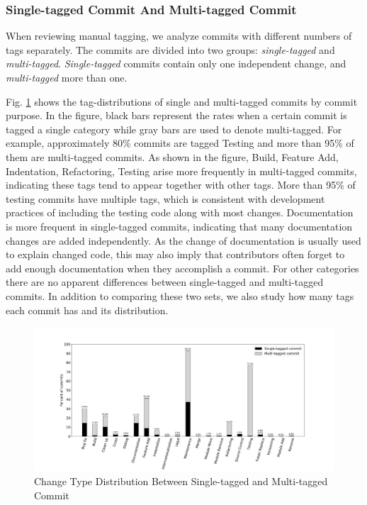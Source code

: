 \subsubsection{Single-tagged Commit And Multi-tagged Commit}

When reviewing manual tagging, we analyze commits with different numbers of tags separately. 
The commits are divided into two groups: \textit{single-tagged} and \textit{multi-tagged}. \textit{Single-tagged} commits contain only one independent change, and \textit{multi-tagged} more than one. 

Fig. \ref{fig: cat_distribution} shows the tag-distributions of single and multi-tagged commits by commit purpose.
In the figure, black bars represent the rates when a certain commit is tagged a single category while gray bars are used to denote multi-tagged. For example, approximately 80\% commits are tagged Testing and more than 95\% of them are multi-tagged commits.
As shown in the figure, Build, Feature Add, Indentation, Refactoring, Testing arise more frequently in multi-tagged commits, indicating these tags tend to appear together with other tags. 
More than 95\% of testing commits have multiple tags, which is consistent with development practices of including the testing code along with most changes.
Documentation is more frequent in single-tagged commits, indicating that many documentation changes are added independently.
As the change of documentation is usually used to explain changed code, this may also imply that contributors often forget to add enough documentation when they accomplish a commit.
For other categories there are no apparent differences between single-tagged and multi-tagged commits.
In addition to comparing these two sets, we also study how many tags each commit has and its distribution. 
\begin{figure}[htbp]
\centerline{\includegraphics[scale=0.30]{figures/cat_distribution_over_s&m_commits.pdf}}
\caption{Change Type Distribution Between Single-tagged and Multi-tagged Commit}
\label{fig: cat_distribution}
\end{figure}

